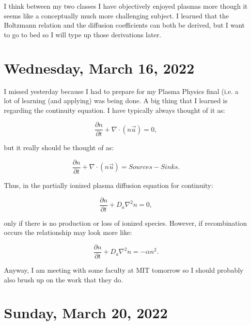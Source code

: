 \documentclass[12pt]{report}
\begin{document}
\par
I think between my two classes I have objectively enjoyed plasmas more though it seems like a conceptually much more challenging subject.  I learned that the Boltzmann relation and the diffusion coefficients can both be derived, but I want to go to bed so I will type up those derivations later. 

\section{Wednesday, March 16, 2022}

\par
I missed yesterday because I had to prepare for my Plasma Physics final (i.e. a lot of learning (and applying) was being done. A big thing that I learned is regarding the continuity equation. I have typically always thought of it as:

\begin{equation}
\frac{\partial n}{\partial t} + \nabla \cdot (n \vec{u}) = 0,
\end{equation}

but it really should be thought of as:

\begin{equation}
\frac{\partial n}{\partial t} + \nabla \cdot (n \vec{u}) = Sources - Sinks.
\end{equation}

Thus, in the partially ionized plasma diffusion equation for continuity:

\begin{equation}
\frac{\partial n}{\partial t} + D_a \nabla ^2 n = 0,
\end{equation}

only if there is no production or loss of ionized species. However, if recombination occurs the relationship may look more like:

\begin{equation}
\frac{\partial n}{\partial t}  + D_a \nabla ^2 n = -\alpha n^2.
\end{equation}

\par
Anyway, I am meeting with some faculty at MIT tomorrow so I should probably also brush up on the work that they do.

\section{Sunday, March 20, 2022}
\end{document}
